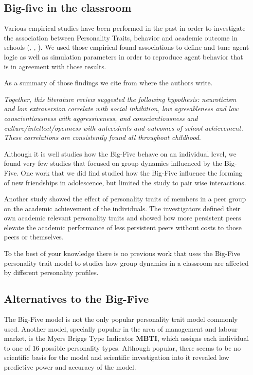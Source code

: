 \subsection{Big-five in the classroom}
Various empirical studies have been performed in the past in order to investigate
the association between Personality Traits, behavior and academic outcome in schools
(\cite{Ehrler1999}, \cite{Nigg2002}, \cite{Asendorpf2003}).
We used those empirical found associations to define and tune agent logic as well
as simulation parameters in order to reproduce agent behavior that is in agreement
with those results.

As a summary of those findings we cite from \cite{Asendorpf2003} where the authors
write.

\bb

\textit{Together, this literature review suggested the following hypothesis:
neuroticism and low extraversion correlate with social inhibition, low agreeableness
and low conscientiousness with aggressiveness, and conscientiousness and
culture/intellect/openness with antecedents and outcomes of school achievement.
These correlations are consistently found all throughout childhood.}

\bb

Although it is well studies how the Big-Five behave on an individual level, we
found very few studies that focused on group dynamics influenced by the
Big-Five. One work that we did find\cite{Selfhout2010} studied how the Big-Five
influence the forming of new friendships in adolescence, but limited the study
to pair wise interactions.

Another study \cite{Golsteyn2017} showed the effect of personality traits of members
in a peer group on the academic achievement of the individuals. The investigators
defined their own academic relevant personality traits and showed how more persistent
peers elevate the academic performance of less persistent peers without costs to
those peers or themselves.

To the best of your knowledge there is no previous work that uses the Big-Five
personality trait model to studies how group dynamics in a classroom are affected
by different personality profiles.

\subsection{Alternatives to the Big-Five}
The Big-Five model is not the only popular personality trait model commonly used.
Another model, specially popular in the area of management and labour market, is the
Myers Briggs Type Indicator \textbf{MBTI}, which assigns each individual to one
of 16 possible personality types. Although popular, there seems to be no scientific
basis for the model and scientific investigation into it\cite{Pittenger1993}
revealed low predictive power and accuracy of the model.

